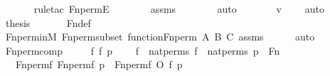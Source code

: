 \begin{isabellebody}
\ \ \ \ \ \ \isamarkupfalse%
{\isacharparenleft}{\kern0pt}rule{\isacharunderscore}{\kern0pt}tac\ Fn{\isacharunderscore}{\kern0pt}permE{\isacharparenright}{\kern0pt}\isanewline
\ \ \ \ \ \ \isamarkupfalse%
\ assms\isanewline
\ \ \ \ \ \ \isamarkupfalse%
\ auto\isanewline
\ \ \ \ \isamarkupfalse%
\ \isamarkupfalse%
\ {\isachardoublequoteopen}v\ {\isasymin}\ {}{\isachardoublequoteclose}\ \isamarkupfalse%
\ auto\isanewline
\ \ \isamarkupfalse%
\isanewline
\isanewline
\ \ \isamarkupfalse%
\ \isamarkupfalse%
\ {\isacharquery}{\kern0pt}thesis\ \isanewline
\ \ \ \ \isamarkupfalse%
\ Fn{\isacharunderscore}{\kern0pt}def\ \isanewline
\ \ \ \ \isamarkupfalse%
\ Fn{\isacharunderscore}{\kern0pt}perm{\isacharunderscore}{\kern0pt}in{\isacharunderscore}{\kern0pt}M\ Fn{\isacharunderscore}{\kern0pt}perm{\isacharunderscore}{\kern0pt}subset\ function{\isacharunderscore}{\kern0pt}Fn{\isacharunderscore}{\kern0pt}perm\ {\isacartoucheopen}{\isacharquery}{\kern0pt}A{\isacartoucheclose}\ {\isacartoucheopen}{\isacharquery}{\kern0pt}B{\isacartoucheclose}\ {\isacartoucheopen}{\isacharquery}{\kern0pt}C{\isacartoucheclose}\ assms\isanewline
\ \ \ \ \isamarkupfalse%
\ auto\isanewline
{}\isamarkupfalse%
%
\endisatagproof
{\isafoldproof}%
%
\isadelimproof
\isanewline
%
\endisadelimproof
\isanewline
{}\isamarkupfalse%
\ Fn{\isacharunderscore}{\kern0pt}perm{\isacharunderscore}{\kern0pt}comp\ {\isacharcolon}{\kern0pt}\ \isanewline
\ \ \ f\ f{\isacharprime}{\kern0pt}\ p\ \isanewline
\ \ \ {\isachardoublequoteopen}f\ {\isasymin}\ nat{\isacharunderscore}{\kern0pt}perms{\isachardoublequoteclose}\ {\isachardoublequoteopen}f{\isacharprime}{\kern0pt}\ {\isasymin}\ nat{\isacharunderscore}{\kern0pt}perms{\isachardoublequoteclose}\ {\isachardoublequoteopen}p\ {\isasymin}\ Fn{\isachardoublequoteclose}\ \isanewline
\ \ \ {\isachardoublequoteopen}Fn{\isacharunderscore}{\kern0pt}perm{\isacharparenleft}{\kern0pt}f{\isacharprime}{\kern0pt}{\isacharcomma}{\kern0pt}\ Fn{\isacharunderscore}{\kern0pt}perm{\isacharparenleft}{\kern0pt}f{\isacharcomma}{\kern0pt}\ p{\isacharparenright}{\kern0pt}{\isacharparenright}{\kern0pt}\ {\isacharequal}{\kern0pt}\ Fn{\isacharunderscore}{\kern0pt}perm{\isacharparenleft}{\kern0pt}f{\isacharprime}{\kern0pt}\ O\ f{\isacharcomma}{\kern0pt}\ p{\isacharparenright}{\kern0pt}{\isachardoublequoteclose}\ \isanewline

\end{isabellebody}
